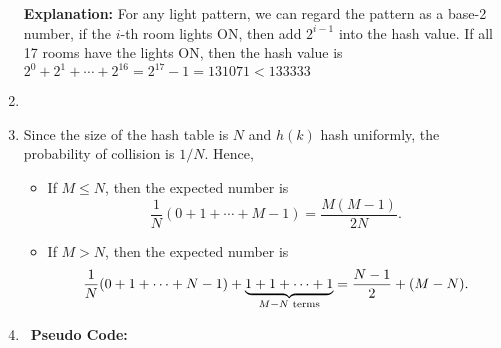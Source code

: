 \documentclass[12pt,a4paper,titlepage,AutoFakeBold]{article}
\begin{document}
\begin{enumerate}[label=\arabic*.,topsep=0pt]
    \vspace{-6mm}
    \hspace{24pt}\begin{minipage}[t]{\linewidth}
        \begin{algorithm}[H]
            \DontPrintSemicolon
        \end{algorithm}
    \end{minipage}
    \textbf{Explanation:} For any light pattern, we can regard the pattern as a base-2 number, if the $i$-th room lights ON, then add $2^{i-1}$ into the hash value. 
    If all 17 rooms have the lights ON, then the hash value is $2^0+2^1+\cdots +2^{16} = 2^{17} - 1 = 131071 < 133333$
    
    \item 
    \item Since the size of the hash table is $N$ and $h(k)$ hash uniformly, the probability of collision is $1 / N$.
    Hence,
    \begin{itemize}[noitemsep,topsep=0pt]
        \item If $M\leq N$, then the expected number is 
        \[
            \frac{1}{N}(0 + 1 + \cdots + M - 1) = \frac{M(M - 1)}{2N}.
        \]
        \item If $M > N$, then the expected number is 
        \[
            \frac{1}{N}(0 + 1 + \cdots + N - 1) +\underbrace{1 + 1 + \cdots + 1}_{M - N \textup{ terms}} = \frac{N - 1}{2} + (M - N).
        \]
    \end{itemize}

    \newpage
    \item \ 
    \textbf{Pseudo Code:}

    \vspace{-6mm}
    \hspace{24pt}\begin{minipage}[t]{\linewidth}
        \begin{algorithm}[H]
            \DontPrintSemicolon
        \end{algorithm}
    \end{minipage}


\end{enumerate}
\end{document}
